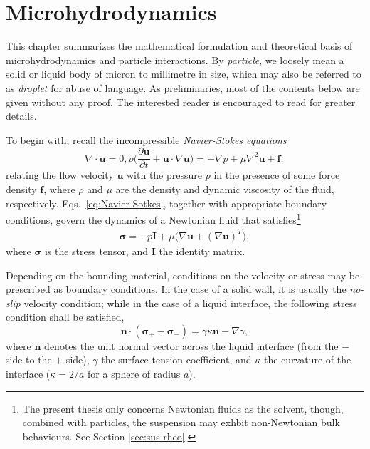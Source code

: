 \chapter{Microhydrodynamics}


This chapter summarizes the mathematical formulation and theoretical basis of microhydrodynamics and particle interactions.
By \emph{particle}, we loosely mean a solid or liquid body of micron to millimetre in size, which may also be referred to as \emph{droplet} for abuse of language.
As preliminaries, most of the contents below are given without any proof. The interested reader is encouraged to read \cite{Batchelor, hb, ps, kim_karrila, graham_2018} for greater details.

\bigskip

To begin with, recall the incompressible \emph{Navier-Stokes equations}
\begin{subequations} \label{eq:Navier-Sotkes}
 \begin{equation}
   \nabla \cdot {\bm u} = 0,
  \label{eq:div-free}
 \end{equation}
 \begin{equation}
   \rho \bigg(\frac{\partial {\bm u}}{\partial t} + {\bm u} \cdot \nabla {\bm u} \bigg) = -\nabla p + \mu \nabla ^2  {\bm u} + {\bm f},
  \label{eq:NS}
 \end{equation}
\end{subequations}
relating the flow velocity $\bm u$ with the pressure $p$ in the presence of some force density $\bm f$, where $\rho$ and $\mu$ are the density and dynamic viscosity of the fluid, respectively.
Eqs.\ \eqref{eq:Navier-Sotkes}, together with appropriate boundary conditions, govern the dynamics of a Newtonian fluid that satisfies\footnote{The present thesis only concerns Newtonian fluids as the solvent, though, combined with particles, the suspension may exhbit non-Newtonian bulk behaviours. See Section \ref{sec:sus-rheo}.}
\begin{equation}
 \begin{aligned}
   {\bm \sigma} = -p {\bm I}+ \mu \bigg( \nabla {\bm u} + (\nabla {\bm u})^T \bigg),
 \end{aligned}
\end{equation}
where $\bm \sigma$ is the stress tensor, and $\bm I$ the identity matrix.

Depending on the bounding material, conditions on the velocity or stress may be prescribed as boundary conditions. In the case of a solid wall, it is usually the \emph{no-slip} velocity condition; while in the case of a liquid interface, the following stress condition shall be satisfied,
\begin{equation} \label{eq:stress-bc}
  {\bm n} \cdot ({\bm \sigma}_+ - {\bm \sigma}_- )  = \gamma \kappa {\bm n} - \nabla \gamma,
\end{equation}
where $\bm n$ denotes the unit normal vector across the liquid interface (from the $-$ side to the $+$ side), $\gamma$ the surface tension coefficient, and $\kappa$ the curvature of the interface (\eg $\kappa=2/a$ for a sphere of radius $a$). 

